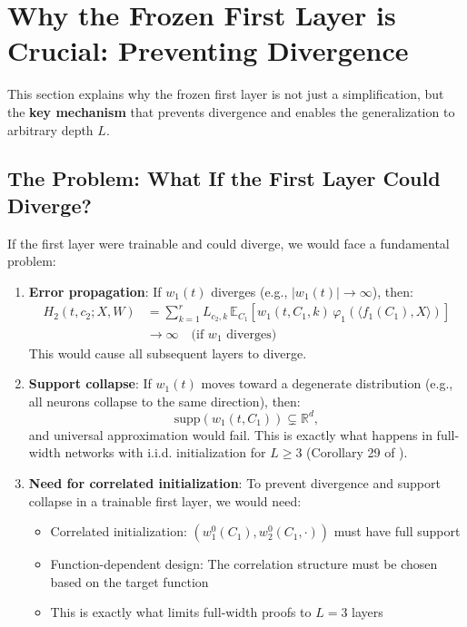 \section{Why the Frozen First Layer is Crucial: Preventing Divergence}
\label{sec:frozen-layer-crucial}

This section explains why the frozen first layer is not just a simplification, but the \textbf{key mechanism} that prevents divergence and enables the generalization to arbitrary depth $L$.

\subsection{The Problem: What If the First Layer Could Diverge?}

If the first layer were trainable and could diverge, we would face a fundamental problem:

\begin{enumerate}
\item \textbf{Error propagation}: If $w_1(t)$ diverges (e.g., $|w_1(t)| \to \infty$), then:
   \begin{align*}
   H_2(t, c_2; X, W) &= \sum_{k=1}^r L_{c_2,k}\,\mathbb{E}_{C_1}[w_1(t, C_1, k)\,\varphi_1(\langle f_1(C_1), X\rangle)]\\
   &\to \infty \quad \text{(if $w_1$ diverges)}
   \end{align*}
   This would cause all subsequent layers to diverge.

\item \textbf{Support collapse}: If $w_1(t)$ moves toward a degenerate distribution (e.g., all neurons collapse to the same direction), then:
   \[
   \text{supp}(w_1(t, C_1)) \subsetneq \mathbb{R}^d,
   \]
   and universal approximation would fail. This is exactly what happens in full-width networks with i.i.d. initialization for $L \geq 3$ (Corollary 29 of \cite{nguyen2023rigorousframeworkmeanfield}).

\item \textbf{Need for correlated initialization}: To prevent divergence and support collapse in a trainable first layer, we would need:
   \begin{itemize}
   \item Correlated initialization: $(w_1^0(C_1), w_2^0(C_1, \cdot))$ must have full support
   \item Function-dependent design: The correlation structure must be chosen based on the target function
   \item This is exactly what limits full-width proofs to $L=3$ layers
   \end{itemize}
\end{enumerate}

